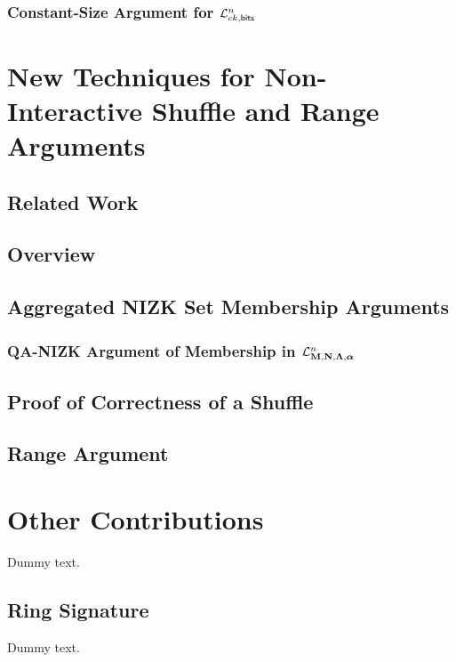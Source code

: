             

        \subsection{Constant-Size Argument for $\mathcal{L}_{ck,\mathsf{bits}}^n$} \label{sec:matr-bits}

            


\chapter{New Techniques for Non-Interactive Shuffle and Range Arguments} \label{sec:shuf-rp}

    

    \section{Related Work} \label{sec:set-memb-rel-work}

        

    \section{Overview} \label{sec:shuf-rp-overview}

        

    \section{Aggregated NIZK Set Membership Arguments} \label{sec:aZKSMP}

        

        \subsection{QA-NIZK Argument of Membership in $\mathcal{L}_{\mathbf{{M}},\mathbf{{N}},\mathbf{{\Lambda}},{\boldsymbol \alpha}}^n$} \label{sec:bin-lan-constr}

            

    \section{Proof of Correctness of a Shuffle} \label{sec:shuffle}

        

    \section{Range Argument} \label{sec:range-proof}

        

\chapter{Other Contributions}

    Dummy text.

    \section{Ring Signature}

Dummy text.
